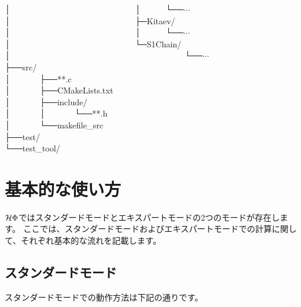 │~~~~~~~~~~~~~~~~~~~~~~~~~~~~~~│~~~~~~└──$\cdots$\\
│~~~~~~~~~~~~~~~~~~~~~~~~~~~~~~├─Kitaev/\\
│~~~~~~~~~~~~~~~~~~~~~~~~~~~~~~│~~~~~~└──$\cdots$\\
│~~~~~~~~~~~~~~~~~~~~~~~~~~~~~~└─S1Chain/\\
│~~~~~~~~~~~~~~~~~~~~~~~~~~~~~~~~~~~~~~~~~~└──$\cdots$\\
├──src/\\
│~~~~~~~├──**.c\\
│~~~~~~~├──CMakeLists.txt\\
│~~~~~~~├──include/\\
│~~~~~~~│~~~~~~~└──**.h\\
│~~~~~~~└──makefile\_src\\
├──test/\\
└──test\_tool/\\

\newpage
\section{基本的な使い方}
$\mathcal{H} \Phi$ではスタンダードモードとエキスパートモードの2つのモードが存在します。
ここでは、スタンダードモードおよびエキスパートモードでの計算に関して、それぞれ基本的な流れを記載します。

\subsection{スタンダードモード}
スタンダードモードでの動作方法は下記の通りです。

